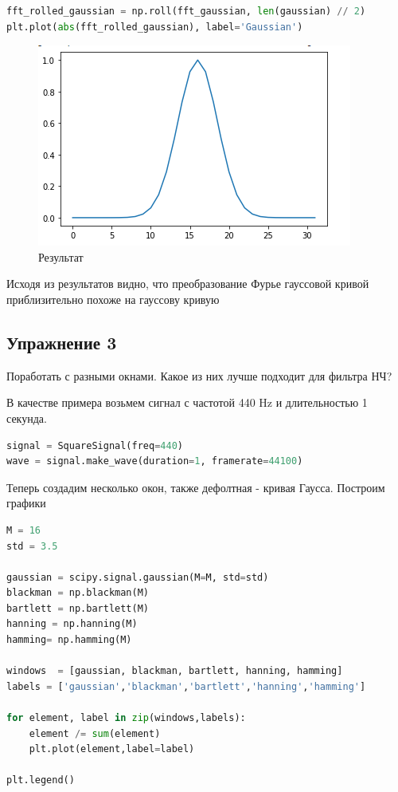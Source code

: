 \begin{lstlisting}[language=Python]
fft_rolled_gaussian = np.roll(fft_gaussian, len(gaussian) // 2)
plt.plot(abs(fft_rolled_gaussian), label='Gaussian')
\end{lstlisting}
\begin{figure}[H]
	\begin{center}
		\includegraphics[scale=1]{fig/lab08/lab08_06.png}
		\caption{Результат}
	\end{center}
\end{figure}

Исходя из результатов видно, что преобразование Фурье гауссовой кривой приблизительно похоже на гауссову кривую


\subsection{Упражнение 3}

Поработать с разными окнами. Какое из них лучше подходит для фильтра НЧ?

В качестве примера возьмем сигнал с частотой 440 Hz и длительностью 1 секунда.

\begin{lstlisting}[language=Python]
signal = SquareSignal(freq=440)
wave = signal.make_wave(duration=1, framerate=44100)
\end{lstlisting}

Теперь создадим несколько окон, также дефолтная - кривая Гаусса. Построим графики

\begin{lstlisting}[language=Python]
M = 16
std = 3.5

gaussian = scipy.signal.gaussian(M=M, std=std)
blackman = np.blackman(M)
bartlett = np.bartlett(M)
hanning = np.hanning(M)
hamming= np.hamming(M)

windows  = [gaussian, blackman, bartlett, hanning, hamming]
labels = ['gaussian','blackman','bartlett','hanning','hamming']

for element, label in zip(windows,labels):
    element /= sum(element)
    plt.plot(element,label=label)
    
plt.legend()
\end{lstlisting}

